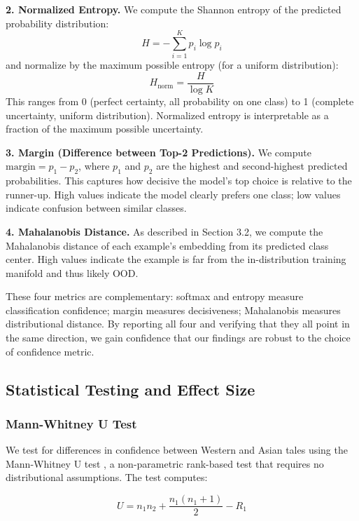 \documentclass{article}
\begin{document}
\textbf{2. Normalized Entropy.} We compute the Shannon entropy of the predicted probability distribution:
\begin{equation}
H = -\sum_{i=1}^{K} p_i \log p_i
\end{equation}
and normalize by the maximum possible entropy (for a uniform distribution):
\begin{equation}
H_{\text{norm}} = \frac{H}{\log K}
\end{equation}
This ranges from 0 (perfect certainty, all probability on one class) to 1 (complete uncertainty, uniform distribution). Normalized entropy is interpretable as a fraction of the maximum possible uncertainty.

\textbf{3. Margin (Difference between Top-2 Predictions).} We compute $\text{margin} = p_1 - p_2$, where $p_1$ and $p_2$ are the highest and second-highest predicted probabilities. This captures how decisive the model's top choice is relative to the runner-up. High values indicate the model clearly prefers one class; low values indicate confusion between similar classes.

\textbf{4. Mahalanobis Distance.} As described in Section 3.2, we compute the Mahalanobis distance of each example's embedding from its predicted class center. High values indicate the example is far from the in-distribution training manifold and thus likely OOD.

These four metrics are complementary: softmax and entropy measure classification confidence; margin measures decisiveness; Mahalanobis measures distributional distance. By reporting all four and verifying that they all point in the same direction, we gain confidence that our findings are robust to the choice of confidence metric.

\subsection{Statistical Testing and Effect Size}

\subsubsection{Mann-Whitney U Test}

We test for differences in confidence between Western and Asian tales using the Mann-Whitney U test \citep{mann1947}, a non-parametric rank-based test that requires no distributional assumptions. The test computes:

\begin{equation}
U = n_1 n_2 + \frac{n_1(n_1 + 1)}{2} - R_1
\end{equation}
\end{document}
